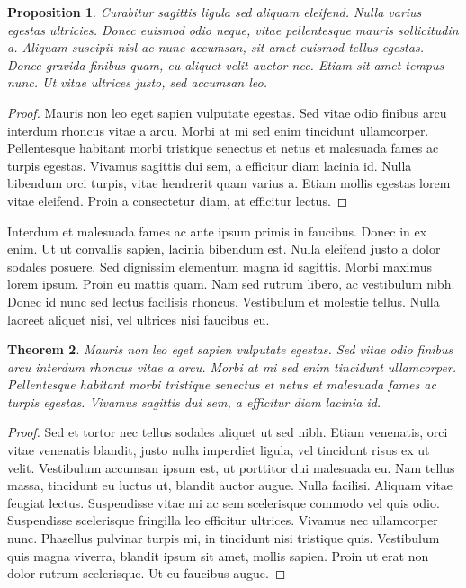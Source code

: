 \documentclass[12pt]{amsart}
\newtheorem{proposition}{Proposition}
\newtheorem{theorem}[proposition]{Theorem}
\theoremstyle{definition}
\theoremstyle{remark}
\begin{document}
\begin{proposition}
 Curabitur sagittis ligula sed aliquam eleifend. Nulla varius egestas ultricies. Donec euismod odio neque, vitae pellentesque mauris sollicitudin a. Aliquam suscipit nisl ac nunc accumsan, sit amet euismod tellus egestas. Donec gravida finibus quam, eu aliquet velit auctor nec. Etiam sit amet tempus nunc. Ut vitae ultrices justo, sed accumsan leo. 
\end{proposition}

\begin{proof}
Mauris non leo eget sapien vulputate egestas. Sed vitae odio finibus arcu interdum rhoncus vitae a arcu. Morbi at mi sed enim tincidunt ullamcorper. Pellentesque habitant morbi tristique senectus et netus et malesuada fames ac turpis egestas. Vivamus sagittis dui sem, a efficitur diam lacinia id. Nulla bibendum orci turpis, vitae hendrerit quam varius a. Etiam mollis egestas lorem vitae eleifend. Proin a consectetur diam, at efficitur lectus. 
\end{proof}

 Interdum et malesuada fames ac ante ipsum primis in faucibus. Donec in ex enim. Ut ut convallis sapien, lacinia bibendum est. Nulla eleifend justo a dolor sodales posuere. Sed dignissim elementum magna id sagittis. Morbi maximus lorem ipsum. Proin eu mattis quam. Nam sed rutrum libero, ac vestibulum nibh. Donec id nunc sed lectus facilisis rhoncus. Vestibulum et molestie tellus. Nulla laoreet aliquet nisi, vel ultrices nisi faucibus eu.

\begin{theorem}
Mauris non leo eget sapien vulputate egestas. Sed vitae odio finibus arcu interdum rhoncus vitae a arcu. Morbi at mi sed enim tincidunt ullamcorper. Pellentesque habitant morbi tristique senectus et netus et malesuada fames ac turpis egestas. Vivamus sagittis dui sem, a efficitur diam lacinia id. 
\end{theorem}

\begin{proof}
 Sed et tortor nec tellus sodales aliquet ut sed nibh. Etiam venenatis, orci vitae venenatis blandit, justo nulla imperdiet ligula, vel tincidunt risus ex ut velit. Vestibulum accumsan ipsum est, ut porttitor dui malesuada eu. Nam tellus massa, tincidunt eu luctus ut, blandit auctor augue. Nulla facilisi. Aliquam vitae feugiat lectus. Suspendisse vitae mi ac sem scelerisque commodo vel quis odio. Suspendisse scelerisque fringilla leo efficitur ultrices. Vivamus nec ullamcorper nunc. Phasellus pulvinar turpis mi, in tincidunt nisi tristique quis. Vestibulum quis magna viverra, blandit ipsum sit amet, mollis sapien. Proin ut erat non dolor rutrum scelerisque. Ut eu faucibus augue. 
\end{proof}
\end{document}
